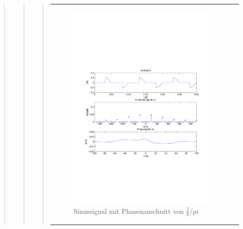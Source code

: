 \begin{quote}
\begin{quote}
\begin{quote}
\begin{center}
\begin{tabular}{ll}
\begin{minipage}{0.6\textwidth}
                    \end{minipage}
                    \begin{minipage}{0.6\textwidth}
    
                       \begin{figure}[H]
                            \label{fig:}
                            \includegraphics[scale=0.5, trim = 1.5cm 7cm 1.5cm 8.5cm,
                            clip]{./Bilder/Phasenanschnitt58pi.pdf} %
                            \caption{Sinussignal mit Phasenanschnitt von $\frac{5}{8}/pi$}
                        \end{figure}
                     \vspace{-1.5em}
    
                    \end{minipage}
    

\end{tabular}
\end{center}
\end{quote}
\end{quote}
\end{quote}
